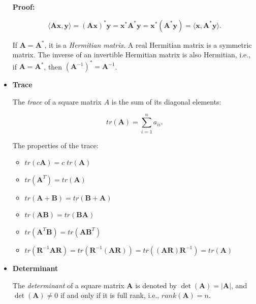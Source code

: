 \documentclass[10pt,b5paper,titlepage]{book}
\begin{document}
\begin{itemize}
        \textbf{Proof:}

        \begin{equation}
            \langle \mathbf{A}\mathbf{x}, \mathbf{y} \rangle
            = (\mathbf{A}\mathbf{x})^{*}\mathbf{y}
            = \mathbf{x}^{*}\mathbf{A}^{*}\mathbf{y}
            = \mathbf{x}^{*}(\mathbf{A}^{*}\mathbf{y})
            = \langle \mathbf{x}, \mathbf{A}^{*}\mathbf{y} \rangle
        .\end{equation}

        If $\mathbf{A} = \mathbf{A}^{*}$, it is a \textit{Hermitian matrix}.
        A real Hermitian matrix is a symmetric matrix. The inverse of an invertible
        Hermitian matrix is also Hermitian, i.e., if $\mathbf{A} = \mathbf{A}^{*}$,
        then $(\mathbf{A}^{-1})^{*} = \mathbf{A}^{-1}$.

    \item \textbf{Trace}

        The \textit{trace} of a square matrix $A$ is the sum of its diagonal elements:

        \begin{equation}
            tr(\mathbf{A}) = \sum_{i=1}^{n} a_{ii}
        .\end{equation}

        The properties of the trace:

        \begin{itemize}
            \item $tr(c \mathbf{A}) = c \; tr(\mathbf{A})$
            \item $tr(\mathbf{A}^{T}) = tr(\mathbf{A})$
            \item $tr(\mathbf{A} + \mathbf{B}) = tr(\mathbf{B} + \mathbf{A})$
            \item $tr(\mathbf{A} \mathbf{B}) = tr(\mathbf{B} \mathbf{A})$
            \item $tr(\mathbf{A}^{T} \mathbf{B}) = tr(\mathbf{A} \mathbf{B}^{T})$
            \item $tr(\mathbf{R}^{-1} \mathbf{A} \mathbf{R})
                = tr(\mathbf{R}^{-1}(\mathbf{A} \mathbf{R}))
                = tr((\mathbf{A} \mathbf{R}) \mathbf{R}^{-1})
                = tr(\mathbf{A})$
        \end{itemize}

    \item \textbf{Determinant}

        The \textit{determinant} of a square matrix $\mathbf{A}$ is denoted by
        $\det(\mathbf{A}) = |\mathbf{A}|$, and $\det(\mathbf{A}) \neq 0$ if and
        only if it is full rank, i.e., $rank(\mathbf{A}) = n$.


\end{itemize}
\end{document}
